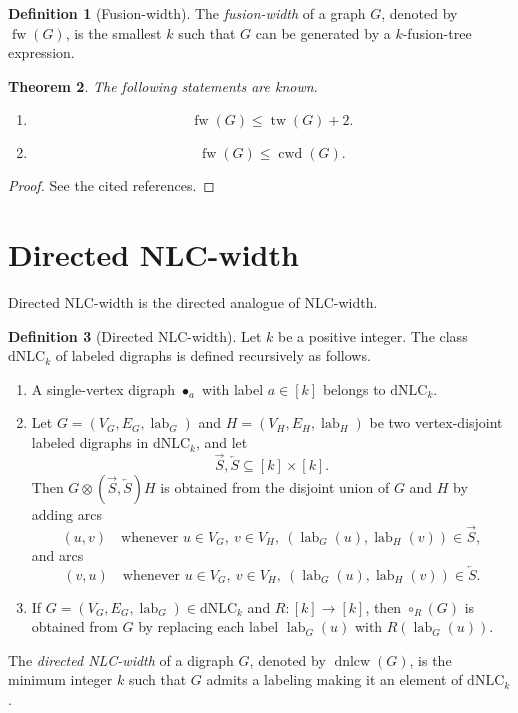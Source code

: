 \documentclass[10pt]{book}
\newtheorem{theorem}{Theorem}[section]
\theoremstyle{definition}
\newtheorem{definition}[theorem]{Definition}
\DeclareMathOperator{\lab}{lab}
\begin{document}
\begin{definition}[Fusion-width]
\cite{64}
The \emph{fusion-width} of a graph \(G\), denoted by \(\operatorname{fw}(G)\), is the smallest \(k\) such that \(G\) can be generated by a \(k\)-fusion-tree expression.
\end{definition}

\begin{theorem}
The following statements are known.
\begin{enumerate}
    \item
    \[
    \operatorname{fw}(G)\leq \operatorname{tw}(G)+2.
    \]
    \cite{64}

    \item
    \[
    \operatorname{fw}(G)\leq \operatorname{cwd}(G).
    \]
    \cite{64}
\end{enumerate}
\end{theorem}

\begin{proof}
See the cited references.
\end{proof}

\section{Directed NLC-width}
Directed NLC-width \cite{65} is the directed analogue of NLC-width.

\begin{definition}[Directed NLC-width]
\label{def:dnlcw}
\cite{65}
Let \(k\) be a positive integer. The class \(\mathrm{dNLC}_k\) of labeled digraphs is defined recursively as follows.
\begin{enumerate}
    \item A single-vertex digraph \(\bullet_a\) with label \(a\in [k]\) belongs to \(\mathrm{dNLC}_k\).

    \item Let \(G=(V_G,E_G,\lab_G)\) and \(H=(V_H,E_H,\lab_H)\) be two vertex-disjoint labeled digraphs in \(\mathrm{dNLC}_k\), and let
    \[
    \overrightarrow{S},\overleftarrow{S}\subseteq [k]\times [k].
    \]
    Then \(G\otimes(\overrightarrow{S},\overleftarrow{S})H\) is obtained from the disjoint union of \(G\) and \(H\) by adding arcs
    \[
    (u,v)\quad\text{whenever }u\in V_G,\ v\in V_H,\ (\lab_G(u),\lab_H(v))\in \overrightarrow{S},
    \]
    and arcs
    \[
    (v,u)\quad\text{whenever }u\in V_G,\ v\in V_H,\ (\lab_G(u),\lab_H(v))\in \overleftarrow{S}.
    \]

    \item If \(G=(V_G,E_G,\lab_G)\in \mathrm{dNLC}_k\) and \(R:[k]\to [k]\), then \(\circ_R(G)\) is obtained from \(G\) by replacing each label \(\lab_G(u)\) with \(R(\lab_G(u))\).
\end{enumerate}

The \emph{directed NLC-width} of a digraph \(G\), denoted by \(\operatorname{dnlcw}(G)\), is the minimum integer \(k\) such that \(G\) admits a labeling making it an element of \(\mathrm{dNLC}_k\).
\end{definition}
\end{document}
